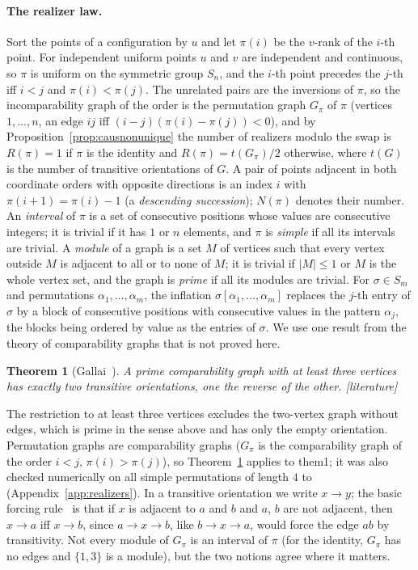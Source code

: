 \documentclass[11pt,a4paper]{article}
\providecommand{\HasRlawChk}{0}
\theoremstyle{plain}
\newtheorem{theorem}{Theorem}[section]
\theoremstyle{definition}
\theoremstyle{remark}
\newcommand{\status}[1]{\textsf{\small [#1]}}
\begin{document}
\paragraph{The realizer law.}
Sort the points of a configuration by $u$ and let $\pi(i)$ be the $v$-rank of the $i$-th point. For independent uniform points $u$ and $v$ are independent and continuous, so $\pi$ is uniform on the symmetric group $S_n$, and the $i$-th point precedes the $j$-th iff $i<j$ and $\pi(i)<\pi(j)$. The unrelated pairs are the inversions of $\pi$, so the incomparability graph of the order is the permutation graph $G_\pi$ of $\pi$ (vertices $1,\dots,n$, an edge $ij$ iff $(i-j)(\pi(i)-\pi(j))<0$), and by Proposition~\ref{prop:causnonunique} the number of realizers modulo the swap is $R(\pi)=1$ if $\pi$ is the identity and $R(\pi)=t(G_\pi)/2$ otherwise, where $t(G)$ is the number of transitive orientations of $G$. A pair of points adjacent in both coordinate orders with opposite directions is an index $i$ with $\pi(i+1)=\pi(i)-1$ (a \emph{descending succession}); $N(\pi)$ denotes their number. An \emph{interval} of $\pi$ is a set of consecutive positions whose values are consecutive integers; it is trivial if it has $1$ or $n$ elements, and $\pi$ is \emph{simple} if all its intervals are trivial. A \emph{module} of a graph is a set $M$ of vertices such that every vertex outside $M$ is adjacent to all or to none of $M$; it is trivial if $|M|\le1$ or $M$ is the whole vertex set, and the graph is \emph{prime} if all its modules are trivial. For $\sigma\in S_m$ and permutations $\alpha_1,\dots,\alpha_m$, the inflation $\sigma[\alpha_1,\dots,\alpha_m]$ replaces the $j$-th entry of $\sigma$ by a block of consecutive positions with consecutive values in the pattern $\alpha_j$, the blocks being ordered by value as the entries of $\sigma$. We use one result from the theory of comparability graphs that is not proved here.

\begin{theorem}[Gallai~\citep{gallai1967}]\label{thm:gallai}
A prime comparability graph with at least three vertices has exactly two transitive orientations, one the reverse of the other. \status{literature}
\end{theorem}

\noindent The restriction to at least three vertices excludes the two-vertex graph without edges, which is prime in the sense above and has only the empty orientation. Permutation graphs are comparability graphs ($G_\pi$ is the comparability graph of the order $i<j$, $\pi(i)>\pi(j)$), so Theorem~\ref{thm:gallai} applies to them\if\HasRlawChk1; it was also checked numerically on all \RlawChkGallaiSimple{} simple permutations of length $4$ to \RlawChkGallaiNmax{} (Appendix~\ref{app:realizers})\fi. In a transitive orientation we write $x\to y$; the basic forcing rule~\citep{gallai1967,golumbic1980} is that if $x$ is adjacent to $a$ and $b$ and $a$, $b$ are not adjacent, then $x\to a$ iff $x\to b$, since $a\to x\to b$, like $b\to x\to a$, would force the edge $ab$ by transitivity. Not every module of $G_\pi$ is an interval of $\pi$ (for the identity, $G_\pi$ has no edges and $\{1,3\}$ is a module), but the two notions agree where it matters.
\end{document}
